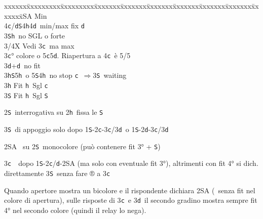 \documentclass[a4paper,italian]{article}
\newcommand{\BS}{\small{\texttt{S}}}
\newcommand{\BC}{\small{\texttt{c}}}
\newcommand{\BD}{\small{\texttt{d}}}
\newcommand{\BH}{\small{\texttt{h}}}
\newenvironment{bidtable}
{\begin{tabbing}

    xxxxxx\=xxxxxxxxx\=xxxxxxxxx\=xxxxxxx\=xxxxxxx\=xxxxxxx\=xxxxxxx\=xxxxxxx\=xxxxxxx\=xxxxxxx\=\kill}
{\end{tabbing} }%
\newenvironment{varie}[1]
{\begin{tcolorbox}[colframe=green!40!black,title=#1]}
    {
\end{tcolorbox} }%
\begin{document}
\begin{multicols}{2}
\begin{bidtable}
        3\small{SA} \> Min\\
        4\BC/\BD {}\BS 4\BH 4\BD\ min/max fix \BD \-\\
        3\BS {}\BH\ no SGL o forte\-\\
        3/4X \> Vedi 3\BC\ ma max\-\\
        3\BC {}° colore o 5\BC 5\BD . Riapertura a 4\BC\ è 5/5\\
        3\BD {}+\BD\ no fit\+\\
        3\BH {}\BS5\BH\ o 5\BS4\BH\ no stop \BC\ $\Rightarrow$3\BS\ waiting\-\\
        3\BH \> Fit \BH\ Sgl \BC\\
        3\BS \> Fit \BH\ Sgl \BS\-\\
    \end{bidtable}
    \begin{varie}{Riepilogo mnemonico per i fissaggi}
        2\BS\ interrogativa su 2\BH\ fissa le \BS

        3\BS\ di appoggio solo dopo 1\BS-2\BC-3\BC/3\BD\ o 1\BS-2\BD-3\BC/3\BD

        2\small{SA} \textregistered\ su 2\BS\ monocolore  (può contenere fit 3° + \BS )

        3\BC\ \textregistered\ dopo 1\BS-2\BC/\BD-2\small{SA} (ma solo con eventuale fit 3°), altrimenti con fit 4° si dich.
        direttamente 3\BS\ senza fare ® a 3\BC

        Quando apertore mostra un bicolore e il rispondente dichiara 2\small{SA} (\textregistered\ senza fit nel colore di apertura), sulle risposte di 3\BC\ e 3\BD\ il secondo gradino mostra sempre fit 4° nel secondo colore (quindi il relay lo nega).


\end{varie}
\end{multicols}
\end{document}

